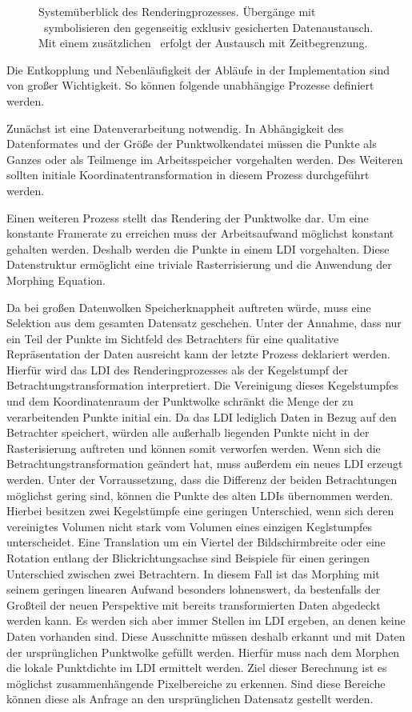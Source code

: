\documentclass[hyperref, beleg, german]{cgvpub}
\begin{document}
\begin{figure}
	\centering
	
	\caption{Systemüberblick des Renderingprozesses. Übergänge mit \faLock\
	symbolisieren den gegenseitig exklusiv gesicherten Datenaustausch. Mit
	einem zusätzlichen \faHourglassHalf\ erfolgt der Austausch mit
	Zeitbegrenzung.}%
	\label{fig:sysoverview}
\end{figure}

Die Entkopplung und Nebenläufigkeit der Abläufe in der Implementation sind von
großer Wichtigkeit. So können folgende unabhängige Prozesse definiert werden.

Zunächst ist eine Datenverarbeitung notwendig. In Abhängigkeit des
Datenformates und der Größe der Punktwolkendatei müssen die Punkte als Ganzes
oder als Teilmenge im Arbeitsspeicher vorgehalten werden. Des Weiteren sollten
initiale Koordinatentransformation in diesem Prozess durchgeführt werden.

Einen weiteren Prozess stellt das Rendering der Punktwolke dar. Um eine
konstante Framerate zu erreichen muss der Arbeitsaufwand möglichst konstant
gehalten werden. Deshalb werden die Punkte in einem LDI vorgehalten. Diese
Datenstruktur ermöglicht eine triviale Rasterrisierung und die Anwendung der
Morphing Equation.

Da bei großen Datenwolken Speicherknappheit auftreten würde, muss eine
Selektion aus dem gesamten Datensatz geschehen. Unter der Annahme, dass nur ein
Teil der Punkte im Sichtfeld des Betrachters für eine qualitative
Repräsentation der Daten ausreicht kann der letzte Prozess deklariert werden.
Hierfür wird das LDI des Renderingprozesses als der Kegelstumpf der
Betrachtungstransformation interpretiert. Die Vereinigung dieses Kegelstumpfes
und dem Koordinatenraum der Punktwolke schränkt die Menge der zu verarbeitenden
Punkte initial ein. Da das LDI lediglich Daten in Bezug auf den Betrachter
speichert, würden alle außerhalb liegenden Punkte nicht in der Rasterisierung
auftreten und können somit verworfen werden. Wenn sich die
Betrachtungstransformation geändert hat, muss außerdem ein neues LDI erzeugt
werden. Unter der Vorraussetzung, dass die Differenz der beiden Betrachtungen
möglichst gering sind, können die Punkte des alten LDIs übernommen werden.
Hierbei besitzen zwei Kegelstümpfe eine geringen Unterschied, wenn sich deren
vereinigtes Volumen nicht stark vom Volumen eines einzigen Keglstumpfes
unterscheidet. Eine Translation um ein Viertel der Bildschirmbreite oder eine
Rotation entlang der Blickrichtungsachse sind Beispiele für einen geringen
Unterschied zwischen zwei Betrachtern. In diesem Fall ist das Morphing mit
seinem geringen linearen Aufwand besonders lohnenswert, da bestenfalls der
Großteil der neuen Perspektive mit bereits transformierten Daten abgedeckt
werden kann. Es werden sich aber immer Stellen im LDI ergeben, an denen keine
Daten vorhanden sind. Diese Ausschnitte müssen deshalb erkannt und mit Daten
der ursprünglichen Punktwolke gefüllt werden. Hierfür muss nach dem Morphen die
lokale Punktdichte im LDI ermittelt werden. Ziel dieser Berechnung ist es
möglichst zusammenhängende Pixelbereiche zu erkennen. Sind diese Bereiche
können diese als Anfrage an den ursprünglichen Datensatz gestellt werden.
\end{document}
